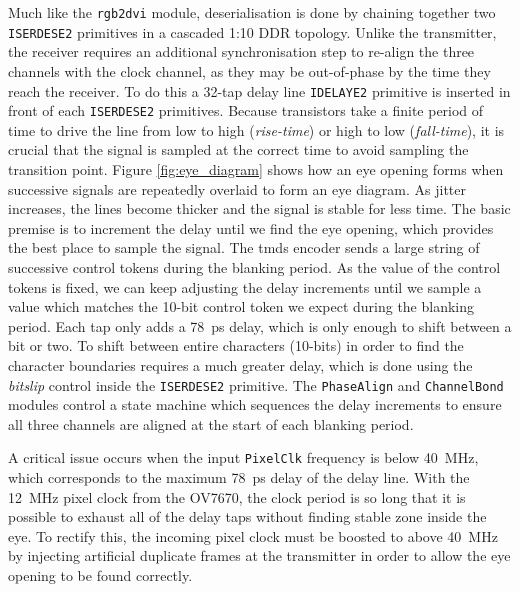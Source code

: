Much like the \texttt{rgb2dvi} module, deserialisation is done by chaining together two \texttt{ISERDESE2} primitives in a cascaded 1:10 DDR topology. Unlike the transmitter, the receiver requires an additional synchronisation step to re-align the three channels with the clock channel, as they may be out-of-phase by the time they reach the receiver. To do this a 32-tap delay line \texttt{IDELAYE2} primitive is inserted in front of each \texttt{ISERDESE2} primitives. Because transistors take a finite period of time to drive the line from low to high (\textit{rise-time}) or high to low (\textit{fall-time}), it is crucial that the signal is sampled at the correct time to avoid sampling the transition point. Figure \ref{fig:eye_diagram} shows how an eye opening forms when successive signals are repeatedly overlaid to form an eye diagram. As jitter increases, the lines become thicker and the signal is stable for less time. The basic premise is to increment the delay until we find the eye opening, which provides the best place to sample the signal. The \gls{tmds} encoder sends a large string of successive control tokens during the blanking period. As the value of the control tokens is fixed, we can keep adjusting the delay increments until we sample a value which matches the 10-bit control token we expect during the blanking period. Each tap only adds a \SI{78}{\pico\second} delay, which is only enough to shift between a bit or two. To shift between entire characters (10-bits) in order to find the character boundaries requires a much greater delay, which is done using the \textit{bitslip} control inside the \texttt{ISERDESE2} primitive. The \texttt{PhaseAlign} and \texttt{ChannelBond} modules control a state machine which sequences the delay increments to ensure all three channels are aligned at the start of each blanking period.

A critical issue occurs when the input \texttt{PixelClk} frequency is below \SI{40}{\mega\hertz}, which corresponds to the maximum \SI{78}{\pico\second} delay of the delay line. With the \SI{12}{\mega\hertz} pixel clock from the OV7670, the clock period is so long that it is possible to exhaust all of the delay taps without finding stable zone inside the eye. To rectify this, the incoming pixel clock must be boosted to above \SI{40}{\mega\hertz} by injecting artificial duplicate frames at the transmitter in order to allow the eye opening to be found correctly.

